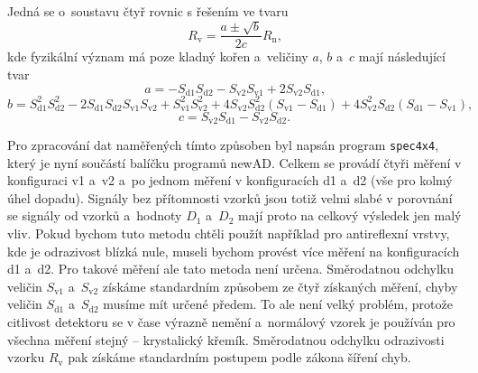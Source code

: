 Jedná se o~soustavu čtyř rovnic s řešením ve tvaru
\begin{equation}
R_\mathrm{v} = \frac{a \pm \sqrt{b}}{2c} R_\mathrm{n} \text{,}
\end{equation}
kde fyzikální význam má poze kladný kořen a~veličiny $a$, $b$ a~$c$ mají následující tvar
\begin{equation}
a = -S_\mathrm{d1} S_\mathrm{d2} - S_\mathrm{v2} S_\mathrm{v1} + 2 S_\mathrm{v2} S_\mathrm{d1} \text{,}
\end{equation}
\begin{equation}
b = S_\mathrm{d1}^2 S_\mathrm{d2}^2 - 2 S_\mathrm{d1} S_\mathrm{d2} S_\mathrm{v1} S_\mathrm{v2} 
				+ S_\mathrm{v1}^2 S_\mathrm{v2}^2 + 4 S_\mathrm{v2} S_\mathrm{d2}^2 (S_\mathrm{v1} - S_\mathrm{d1}) 
				+ 4 S_\mathrm{v2}^2 S_\mathrm{d2} (S_\mathrm{d1} - S_\mathrm{v1}) \text{,}
\end{equation}
\begin{equation}
c = S_\mathrm{v2} S_\mathrm{d1} - S_\mathrm{v2} S_\mathrm{d2} \text{.}
\end{equation}

Pro zpracování dat naměřených tímto způsoben byl napsán program \texttt{spec4x4}, který je nyní součástí balíčku programů newAD. Celkem se provádí čtyři měření v konfiguraci v1 a~v2 a~po jednom měření v konfiguracích d1 a~d2 (vše pro kolmý úhel dopadu). Signály bez přítomnosti vzorků jsou totiž velmi slabé v porovnání se signály od vzorků a~hodnoty $D_1$ a~$D_2$ mají proto na celkový výsledek jen malý vliv. 
Pokud bychom tuto metodu chtěli použít například pro antireflexní vrstvy, kde je odrazivost blízká nule, museli bychom provést více měření na konfiguracích d1 a~d2. Pro takové měření ale tato metoda není určena.
Směrodatnou odchylku veličin $S_\mathrm{v1}$ a~$S_\mathrm{v2}$ získáme standardním způsobem ze čtyř získaných měření, chyby veličin $S_\mathrm{d1}$ a~$S_\mathrm{d2}$ musíme mít určené předem. To ale není velký problém, protože citlivost detektoru se v čase výrazně nemění a~normálový vzorek je používán pro všechna měření stejný -- krystalický křemík. 
Směrodatnou odchylku odrazivosti vzorku $R_\mathrm{v}$ pak získáme standardním postupem podle zákona šíření chyb.

